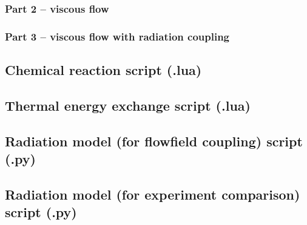 \subsubsection{Part 2 -- viscous flow}

\topbar

\bottombar

\subsubsection{Part 3 -- viscous flow with radiation coupling}

\topbar

\bottombar

\subsection{Chemical reaction script (.lua)}

\topbar

\bottombar

\subsection{Thermal energy exchange script (.lua)}

\topbar

\bottombar

\subsection{Radiation model (for flowfield coupling) script (.py)}

\topbar

\bottombar

\subsection{Radiation model (for experiment comparison) script (.py)}

\topbar

\bottombar

% 

